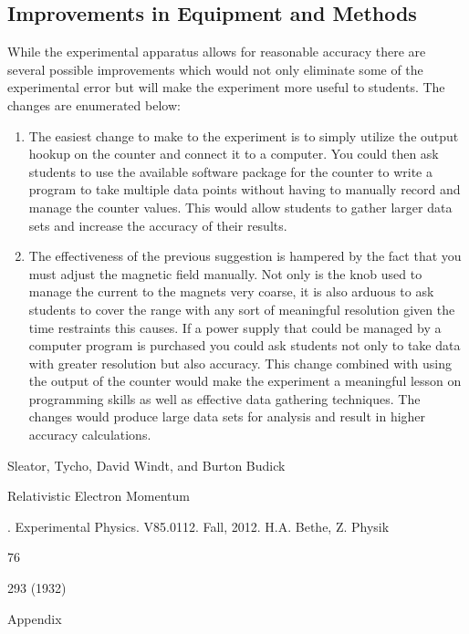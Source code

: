 \subsection{Improvements in Equipment and Methods}
While the experimental apparatus allows for reasonable accuracy there are several possible improvements which would not only eliminate some of the experimental error but will make the experiment more useful to students.  The changes are enumerated below:
\begin{enumerate}
\item The easiest change to make to the experiment is to simply utilize the output hookup on the counter and connect it to a computer. You could then ask students to use the available software package for the counter to write a program to take multiple data points without having to manually record and manage the counter values.  This would allow students to gather larger data sets and increase the accuracy of their results. 
\item The effectiveness of the previous suggestion is hampered by the fact that you must adjust the magnetic field manually.  Not only is the knob used to manage the current to the magnets very coarse, it is also arduous to ask students to cover the range with any sort of meaningful resolution given the time restraints this causes.  If a power supply that could be managed by a computer program is purchased you could ask students not only to take data with greater resolution but also accuracy. This change combined with using the output of the counter would make the experiment a meaningful lesson on programming skills as well as effective data gathering techniques. The changes would produce large data sets for analysis and result in higher accuracy calculations.  
\end{enumerate} 


\begin{thebibliography}{99}
Sleator, Tycho, David Windt, and Burton Budick \begin{em}Relativistic Electron Momentum\end{em}. Experimental Physics. V85.0112. Fall, 2012.
 H.A. Bethe, Z. Physik \begin{em} 76 \end{em} 293 (1932)
\end{thebibliography}

\newpage \LARGE{Appendix}

